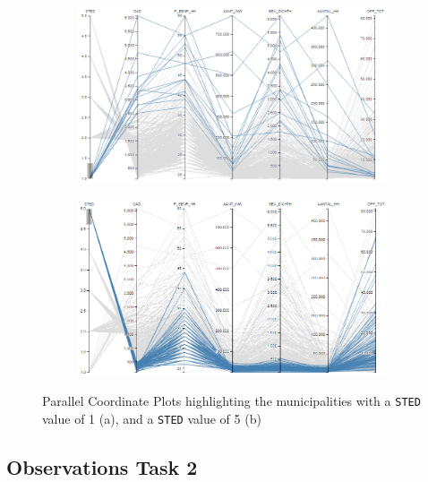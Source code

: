 \begin{figure}[h!]
    \centering
    \captionsetup{justification=centering,margin=2cm}
    \begin{subfigure}[t]{0.48\textwidth}
        \includegraphics[width=\textwidth]{img/pcp_STED1.png}
        \caption{ }
    \end{subfigure}
    \begin{subfigure}[t]{0.48\textwidth}
        \includegraphics[width=\textwidth]{img/pcp_STED5.png}
        \caption{ }
    \end{subfigure}
    \label{fig:pcp_sted}
    \caption{Parallel Coordinate Plots highlighting the municipalities with a \texttt{STED} value of 1 (a), and a \texttt{STED} value of 5 (b)}
\end{figure}

\subsection{Observations Task 2}

